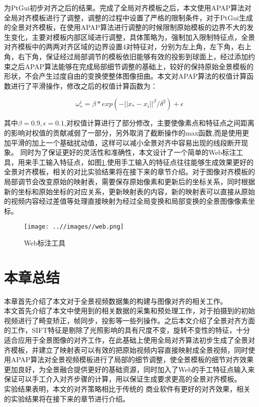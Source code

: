 为PtGui初步对齐之后的结果。完成了全局对齐模板之后，本文使用APAP算法对全局对齐模板进行了调整，调整的过程中设置了严格的限制条件，对于PtGui生成的全景对齐模板，在使用APAP算法进行调整的时候限制原始模板的边界不大的发生变化，主要对模板内部区域进行调整，具体策略为，强制加入限制特征点，全景对齐模板中的两两对齐区域的边界设置4对特征对，分别为左上角，左下角，右上角，右下角，保证经过局部调节的模板依旧能够有效的投影到球面上，经过添加约束之后APAP算法能够在完成局部细节调整的基础上，较好的保持原始全景模板的形状，不会产生过度自由的变换使整体图像扭曲。本文对APAP算法的权值计算函数进行了平滑操作，修改之后的权值计算函数为：
\begin{center}
  \begin{equation}\label{mod_apap}
    \omega_*^i=\beta*exp(-||x_*-x_i||^\beta/\delta^2)+\epsilon
  \end{equation}
\end{center}
其中$\beta=0.9,\epsilon=0.1$,对权值计算进行了部分修改，主要使像素点和特征点之间距离的影响对权值的贡献减弱了一部分，另外取消了截断操作的max函数,而是使用更加平滑的加上一个基础扰动值，这样可以减小全景对齐中容易出现的线段断开现象。
同时为了保证更好的灵活性和准确性，本文设计了一个简单的Web标注工具，用来手工输入特征点，如图\ref{web},使用手工输入的特征点往往能够生成效果更好的全景对齐模板，相关的对比实验结果将在接下来的章节介绍。对于图像对齐模板的局部调节会改变原始的映射表，需要保存原始像素和更新后的坐标关系，同时根据新的坐标和原始坐标的对应关系，更新映射表的内容，新的映射表可以直接从原始的视频内容经过差值等处理直接映射为经过全局变换和局部变换的全景图像像素坐标。
\begin{center}
  \begin{figure}[h]
    \centering
    \texttt{[image: ..//images//web.png]}
    \caption{Web标注工具}\label{web}
  \end{figure}
\end{center}

\section{本章总结}
本章首先介绍了本文对于全景视频数据集的构建与图像对齐的相关工作。\\
\indent 本文首先介绍了本文中使用到的相关数据的采集和预处理工作，对于拍摄到的初始视频进行了畸变矫正，帧同步，投影等一些列操作。之后本文介绍了全景对齐方面的工作，SIFT特征是剔除了光照影响的具有尺度不变，旋转不变性的特征，十分适合应用于全景图像的对齐工作，在此基础上使用全局对齐算法初步生成了全景对齐模板，并建立了映射表可以有效的把原始视频内容直接映射成全景视频，同时使用APAP算法对全景视频模板进行了局部的细节调整，使全景模板的细节对齐效果更加良好，为全景融合提供更好的基础资源，同时加入了Web的手工特征点输入来保证可以手工介入对齐步骤的计算，用以保证生成要求更高的全景对齐模板。\\
\indent 实验结果表明，本文的对齐策略相比于传统的
商业软件有更好的对齐效果，相关的实验结果将在接下来的章节进行介绍。



